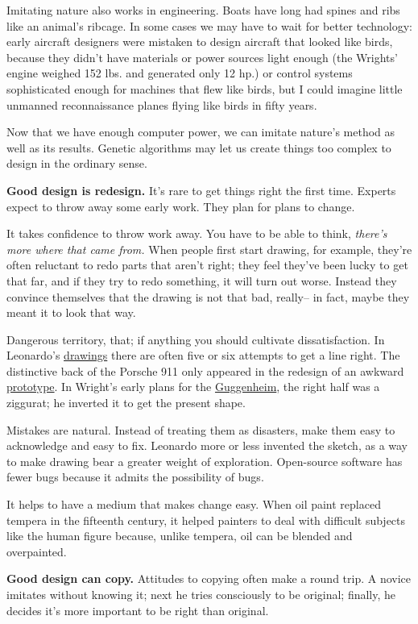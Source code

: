 Imitating nature also works in engineering. Boats have long had spines
and ribs like an animal's ribcage. In some cases we may have to wait for
better technology: early aircraft designers were mistaken to design
aircraft that looked like birds, because they didn't have materials or
power sources light enough (the Wrights' engine weighed 152 lbs. and
generated only 12 hp.) or control systems sophisticated enough for
machines that flew like birds, but I could imagine little unmanned
reconnaissance planes flying like birds in fifty years.

Now that we have enough computer power, we can imitate nature's method
as well as its results. Genetic algorithms may let us create things too
complex to design in the ordinary sense.

\textbf{Good design is redesign.} It's rare to get things right the
first time. Experts expect to throw away some early work. They plan for
plans to change.

It takes confidence to throw work away. You have to be able to think,
\emph{there's more where that came from.} When people first start
drawing, for example, they're often reluctant to redo parts that aren't
right; they feel they've been lucky to get that far, and if they try to
redo something, it will turn out worse. Instead they convince themselves
that the drawing is not that bad, really-- in fact, maybe they meant it
to look that way.

Dangerous territory, that; if anything you should cultivate
dissatisfaction. In Leonardo's \href{leonardo.html}{drawings} there are
often five or six attempts to get a line right. The distinctive back of
the Porsche 911 only appeared in the redesign of an awkward
\href{porsche695.html}{prototype}. In Wright's early plans for the
\href{guggen.html}{Guggenheim}, the right half was a ziggurat; he
inverted it to get the present shape.

Mistakes are natural. Instead of treating them as disasters, make them
easy to acknowledge and easy to fix. Leonardo more or less invented the
sketch, as a way to make drawing bear a greater weight of exploration.
Open-source software has fewer bugs because it admits the possibility of
bugs.

It helps to have a medium that makes change easy. When oil paint
replaced tempera in the fifteenth century, it helped painters to deal
with difficult subjects like the human figure because, unlike tempera,
oil can be blended and overpainted.

\textbf{Good design can copy.} Attitudes to copying often make a round
trip. A novice imitates without knowing it; next he tries consciously to
be original; finally, he decides it's more important to be right than
original.

